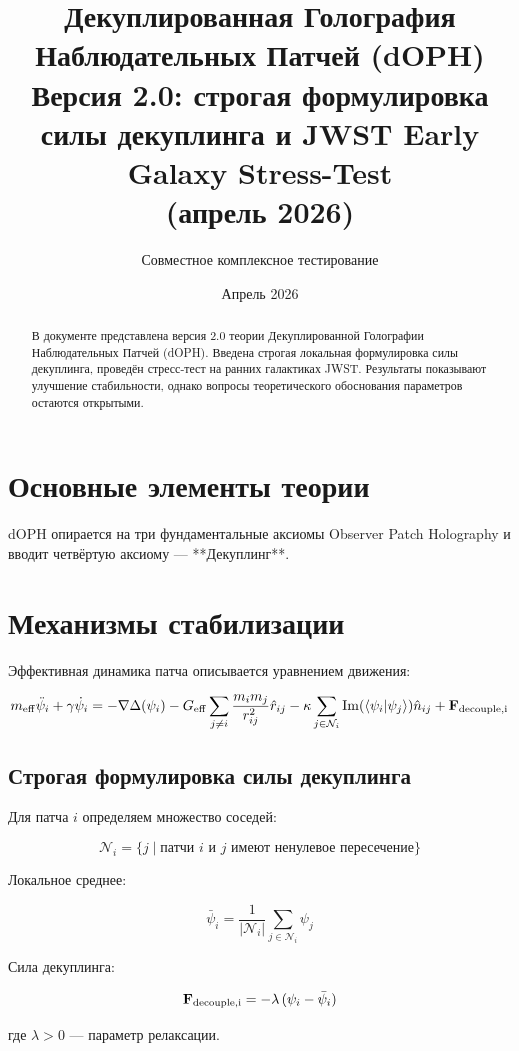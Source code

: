 \documentclass[11pt,a4paper]{article}
\title{\textbf{Декуплированная Голография Наблюдательных Патчей (dOPH)}\\
\textbf{Версия 2.0: строгая формулировка силы декуплинга и JWST Early Galaxy Stress-Test}\\
\textbf{(апрель 2026)}}
\author{Совместное комплексное тестирование}
\date{Апрель 2026}
\begin{document}
\maketitle

\begin{abstract}
В документе представлена версия 2.0 теории Декуплированной Голографии Наблюдательных Патчей (dOPH). 
Введена строгая локальная формулировка силы декуплинга, проведён стресс-тест на ранних галактиках JWST. 
Результаты показывают улучшение стабильности, однако вопросы теоретического обоснования параметров остаются открытыми.
\end{abstract}

\section{Основные элементы теории}

dOPH опирается на три фундаментальные аксиомы Observer Patch Holography и вводит четвёртую аксиому — **Декуплинг**.

\section{Механизмы стабилизации}

Эффективная динамика патча описывается уравнением движения:

\[
m_{\rm eff} \ddot{\psi}_i + \gamma \dot{\psi}_i = -\nabla \Delta(\psi_i) - G_{\rm eff} \sum_{j \neq i} \frac{m_i m_j}{r_{ij}^2} \hat{r}_{ij} 
- \kappa \sum_{j \in \mathcal{N}_i} \Im(\langle \psi_i | \psi_j \rangle) \hat{n}_{ij} + \mathbf{F}_{\rm decouple,i}
\]

\subsection{Строгая формулировка силы декуплинга}

Для патча \(i\) определяем множество соседей:

\[
\mathcal{N}_i = \{ j \mid \text{патчи } i \text{ и } j \text{ имеют ненулевое пересечение} \}
\]

Локальное среднее:

\[
\bar{\psi}_i = \frac{1}{|\mathcal{N}_i|} \sum_{j \in \mathcal{N}_i} \psi_j
\]

Сила декуплинга:

\[
\mathbf{F}_{\rm decouple,i} = -\lambda \, (\psi_i - \bar{\psi}_i)
\]

где \(\lambda > 0\) — параметр релаксации.
\end{document}
